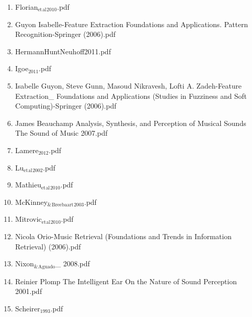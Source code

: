 \documentclass[11pt]{article}
\begin{document}
\begin{enumerate}
\begin{enumerate}
\begin{enumerate}
\begin{enumerate}
\begin{enumerate}
\item Florian$_{\text{et}}$$_{\text{al}}$$_{\text{2010}}$.pdf
\label{sec-1-1-1-1-7-2-1-17}

\item Guyon Isabelle-Feature Extraction Foundations and Applications. Pattern Recognition-Springer (2006).pdf
\label{sec-1-1-1-1-7-2-1-18}

\item HermannHuntNeuhoff2011.pdf
\label{sec-1-1-1-1-7-2-1-19}

\item Igoe$_{\text{2011}}$.pdf
\label{sec-1-1-1-1-7-2-1-20}

\item Isabelle Guyon, Steve Gunn, Masoud Nikravesh, Lofti A. Zadeh-Feature Extraction\_ Foundations and Applications (Studies in Fuzziness and Soft Computing)-Springer (2006).pdf
\label{sec-1-1-1-1-7-2-1-21}

\item James Beauchamp Analysis, Synthesis, and Perception of Musical Sounds The Sound of Music  2007.pdf
\label{sec-1-1-1-1-7-2-1-22}

\item Lamere$_{\text{2012}}$.pdf
\label{sec-1-1-1-1-7-2-1-23}

\item Lu$_{\text{et}}$$_{\text{al}}$$_{\text{2002}}$.pdf
\label{sec-1-1-1-1-7-2-1-24}

\item Mathieu$_{\text{et}}$$_{\text{al}}$$_{\text{2010}}$.pdf
\label{sec-1-1-1-1-7-2-1-25}

\item McKinney$_{\text{\&}}$$_{\text{Breebaart}}$$_{\text{2003}}$.pdf
\label{sec-1-1-1-1-7-2-1-26}

\item Mitrovic$_{\text{et}}$$_{\text{al}}$$_{\text{2010}}$.pdf
\label{sec-1-1-1-1-7-2-1-27}

\item Nicola Orio-Music Retrieval (Foundations and Trends in Information Retrieval) (2006).pdf
\label{sec-1-1-1-1-7-2-1-28}

\item Nixon$_{\text{\&}}$$_{\text{Aguado}}$\_ 2008.pdf
\label{sec-1-1-1-1-7-2-1-29}

\item Reinier Plomp The Intelligent Ear On the Nature of Sound Perception    2001.pdf
\label{sec-1-1-1-1-7-2-1-30}

\item Scheirer$_{\text{1993}}$.pdf
\label{sec-1-1-1-1-7-2-1-31}


\end{enumerate}
\end{enumerate}
\end{enumerate}
\end{enumerate}
\end{enumerate}
\end{document}
